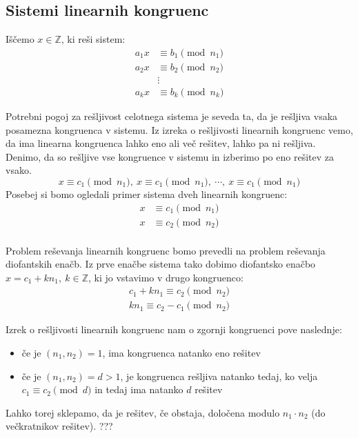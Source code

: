 \documentclass[12pt, a4paper]{article}
\begin{document}
\subsection{Sistemi linearnih kongruenc}
 
Iščemo $x\in \mathbb{Z}$, ki reši sistem:
\begin{align*}
a_{1}x&\equiv b_{1} \pmod{n_{1}} \\
a_{2}x&\equiv b_{2} \pmod{n_{2}} \\
&\vdots \\
a_{k}x&\equiv b_{k} \pmod{n_{k}}
\end{align*} 

Potrebni pogoj za rešljivost celotnega sistema je seveda ta, da je rešljiva vsaka posamezna kongruenca v sistemu. Iz izreka o rešljivosti linearnih kongruenc vemo, da ima linearna kongruenca lahko eno ali več rešitev, lahko pa ni rešljiva. Denimo, da so rešljive vse kongruence v sistemu in izberimo po eno rešitev za vsako.
$$
x\equiv c_{1} \pmod{n_{1}},\  x\equiv c_{1} \pmod{n_{1}},\ \cdots,\  x\equiv c_{1} \pmod{n_{1}}
$$
Posebej si bomo ogledali primer sistema dveh linearnih kongruenc:
\begin{align*}
x&\equiv c_{1} \pmod{n_{1}} \\
x&\equiv c_{2} \pmod{n_{2}} \\
\end{align*}

Problem reševanja linearnih kongruenc bomo prevedli na problem reševanja diofantskih enačb. Iz prve enačbe sistema tako dobimo diofantsko enačbo $x=c_{1}+kn_{1},\ k\in \mathbb{Z}$, ki jo vstavimo v drugo kongruenco:
\begin{gather*}
c_{1} + kn_{1} \equiv c_{2} \pmod{n_{2}} \\
kn_{1}\equiv c_{2}-c_{1} \pmod{n_{2}}
\end{gather*}

Izrek o rešljivosti linearnih kongruenc nam o zgornji kongruenci pove naslednje:
\begin{itemize}
\item če je $(n_{1},n_{2})=1$, ima kongruenca natanko eno rešitev
\item če je $(n_{1},n_{2})=d>1$, je kongruenca rešljiva natanko tedaj, ko velja $c_{1}\equiv c_{2} \pmod d$ in tedaj ima natanko $d$ rešitev
\end{itemize}

Lahko torej sklepamo, da je rešitev, če obstaja, določena modulo $n_{1}\cdot n_{2}$ (do večkratnikov rešitev). ???
\end{document}
